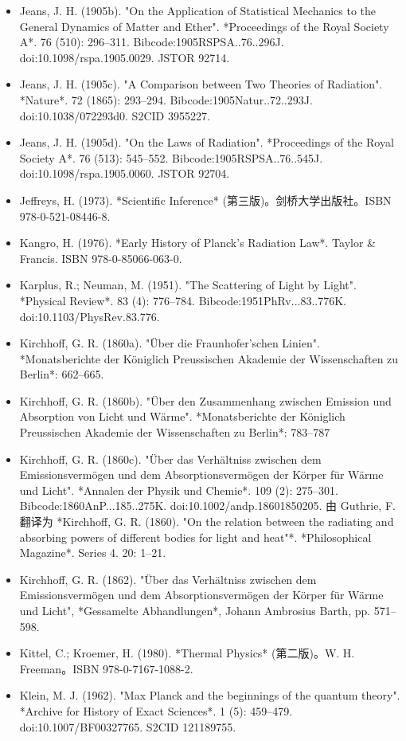 \begin{itemize}
\item Jeans, J. H. (1905b). "On the Application of Statistical Mechanics to the General Dynamics of Matter and Ether". *Proceedings of the Royal Society A*. 76 (510): 296–311. Bibcode:1905RSPSA..76..296J. doi:10.1098/rspa.1905.0029. JSTOR 92714.  
\item Jeans, J. H. (1905c). "A Comparison between Two Theories of Radiation". *Nature*. 72 (1865): 293–294. Bibcode:1905Natur..72..293J. doi:10.1038/072293d0. S2CID 3955227.  
\item Jeans, J. H. (1905d). "On the Laws of Radiation". *Proceedings of the Royal Society A*. 76 (513): 545–552. Bibcode:1905RSPSA..76..545J. doi:10.1098/rspa.1905.0060. JSTOR 92704.  
\item Jeffreys, H. (1973). *Scientific Inference* (第三版)。剑桥大学出版社。ISBN 978-0-521-08446-8.  
\item Kangro, H. (1976). *Early History of Planck's Radiation Law*. Taylor & Francis. ISBN 978-0-85066-063-0.  
\item Karplus, R.; Neuman, M. (1951). "The Scattering of Light by Light". *Physical Review*. 83 (4): 776–784. Bibcode:1951PhRv...83..776K. doi:10.1103/PhysRev.83.776.  
\item Kirchhoff, G. R. (1860a). "Über die Fraunhofer'schen Linien". *Monatsberichte der Königlich Preussischen Akademie der Wissenschaften zu Berlin*: 662–665.  
\item Kirchhoff, G. R. (1860b). "Über den Zusammenhang zwischen Emission und Absorption von Licht und Wärme". *Monatsberichte der Königlich Preussischen Akademie der Wissenschaften zu Berlin*: 783–787
\item Kirchhoff, G. R. (1860c). "Über das Verhältniss zwischen dem Emissionsvermögen und dem Absorptionsvermögen der Körper für Wärme und Licht". *Annalen der Physik und Chemie*. 109 (2): 275–301. Bibcode:1860AnP...185..275K. doi:10.1002/andp.18601850205.  
  由 Guthrie, F. 翻译为 *Kirchhoff, G. R. (1860). "On the relation between the radiating and absorbing powers of different bodies for light and heat"*. *Philosophical Magazine*. Series 4. 20: 1–21.  
\item Kirchhoff, G. R. (1862). "Über das Verhältniss zwischen dem Emissionsvermögen und dem Absorptionsvermögen der Körper für Wärme und Licht", *Gessamelte Abhandlungen*, Johann Ambrosius Barth, pp. 571–598.  
\item Kittel, C.; Kroemer, H. (1980). *Thermal Physics* (第二版)。W. H. Freeman。ISBN 978-0-7167-1088-2.  
\item Klein, M. J. (1962). "Max Planck and the beginnings of the quantum theory". *Archive for History of Exact Sciences*. 1 (5): 459–479. doi:10.1007/BF00327765. S2CID 121189755.  

\end{itemize}
